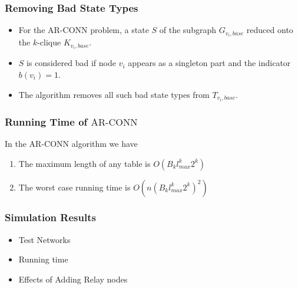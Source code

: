 \documentclass{beamer}
\newcommand{\ARCONN}   { {\mathrm {AR\mbox{-}CONN}} }
\begin{document}
\begin{frame}
\frametitle{Removing Bad State Types}
\begin{itemize}

\item For the $\ARCONN$ problem, a state $S$ of the subgraph $G_{v_i,base}$ reduced onto the $k$-clique $K_{v_i,base}$.
\item $S$ is considered bad if node $v_i$ appears as a singleton part and the indicator $b({v_i})=1$.
\item The algorithm removes all such bad state types from $T_{v_i,base}$.

\end{itemize}
\end{frame}
\begin{frame}
\frametitle{Running Time of $\ARCONN$}
\begin{center}
\begin{theorem}\normalfont In the $\ARCONN$ algorithm we have\label{thm:rt}
\begin{enumerate}
\item The maximum length of any table is $O(B_kl_{max}^k2^k)$ 
\item The worst case running time is $O(n(B_kl_{max}^k2^k)^2)$
\end{enumerate}
\end{theorem}
\end{center}
\end{frame}
\begin{frame}
\frametitle{Simulation Results}
\begin{itemize}
\item Test Networks
\item Running time
\item Effects of Adding Relay nodes
\end{itemize}
\end{frame}
\end{document}
